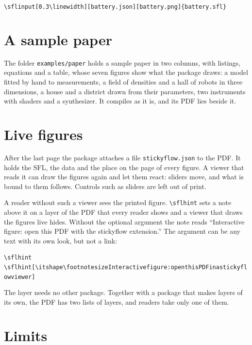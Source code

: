 \documentclass{article}
\newenvironment{code}{\par\smallskip\begin{alltt}\small}{\end{alltt}\smallskip}
\begin{document}
\begin{code}
\textbackslash{}sflinput[0.3\textbackslash{}linewidth][battery.json][battery.png]\{battery.sfl\}
\end{code}

\section{A sample paper}

The folder \texttt{examples/paper} holds a sample paper in two columns, with listings, equations and a table, whose seven figures show
what the package draws: a model fitted by hand to measurements, a field of densities and a hall of robots in three dimensions, a house and
a district drawn from their parameters, two instruments with shaders and a synthesizer. It compiles as it is, and its PDF lies beside it.

\section{Live figures}

After the last page the package attaches a file \texttt{stickyflow.json} to the PDF. It holds the SFL, the data and the place on the page of
every figure. A viewer that reads it can draw the figures again and let them react: sliders move, and what is bound to them follows.
Controls such as sliders are left out of print.

A reader without such a viewer sees the printed figure. \texttt{\textbackslash{}sflhint} sets a note above it on a layer of the PDF that
every reader shows and a viewer that draws the figures live hides. Without the optional argument the note reads ``Interactive figure:
open this PDF with the stickyflow extension.'' The argument can be any text with its own look, but not a link:

\begin{code}
\textbackslash{}sflhint
\textbackslash{}sflhint[\textbackslash{}itshape\textbackslash{}footnotesize Interactive figure: open this PDF in a stickyflow viewer]
\end{code}

The layer needs no other package. Together with a package that makes layers of its own, the PDF has two lists of layers, and readers
take only one of them.

\section{Limits}
\end{document}

